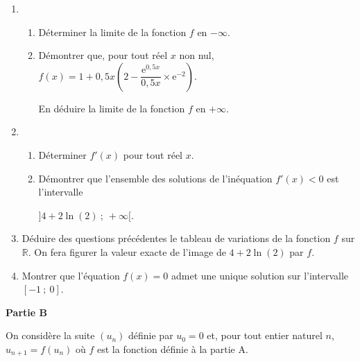 \documentclass[10pt,a4paper]{article}
\newcommand{\R}{\mathbb{R}}
\begin{document}
\begin{enumerate}
\item 
	\begin{enumerate}
		\item Déterminer la limite de la fonction $f$ en $- \infty$.
		\item Démontrer que, pour tout réel $x$ non nul, $f(x) = 1+ 0,5x\left(2 - \dfrac{\text{e}^{0,5x}}{0,5x} \times \text{e}^{-2}\right)$.
		
En déduire la limite de la fonction $f$ en $+\infty$.
	\end{enumerate}
\item 
	\begin{enumerate}
		\item Déterminer $f'(x)$ pour tout réel $x$.
		\item Démontrer que l'ensemble des solutions de l'inéquation $f'(x) < 0$ est l'intervalle 
		
		$]4 + 2\ln (2)~;~+\infty[$.
	\end{enumerate}	
\item Déduire des questions précédentes le tableau de variations de la fonction $f$ sur $\R$. On fera figurer la valeur exacte de l'image de $4 + 2\ln (2)$ par $f$.
\item Montrer que l'équation $f(x) = 0$ admet une unique solution sur l'intervalle $[-1~;~0]$.
\end{enumerate}

\bigskip

\textbf{Partie B}

\medskip

On considère la suite $\left(u_n\right)$ définie par $u_0 = 0$ et, pour tout entier naturel $n$,
\: $u_{n+1} = f\left(u_n\right)$ où $f$ est la fonction définie à la partie A.

\medskip
\end{document}
